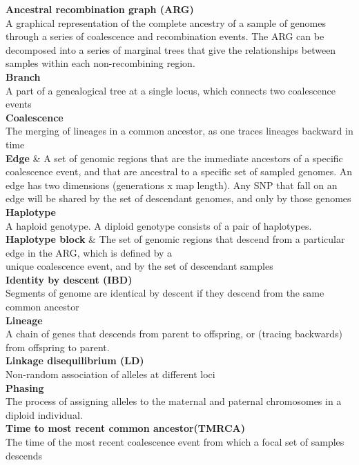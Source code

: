 \documentclass[twocolumn]{bmcart}%
\begin{document}
\begin{strip}
\begin{tcolorbox}[colback=blue!5!white,colframe=blue!50!black,title= Glossary]
\footnotesize{\textbf{Ancestral recombination graph (ARG)} \\A graphical representation of the complete ancestry of a sample of genomes through a series of coalescence and recombination events. The ARG can be decomposed into a series of marginal trees that give the relationships between samples within each non-recombining region.
   \\
\textbf{Branch}\\ A part of a genealogical tree at a single locus, which connects two coalescence events 
   \\
\textbf{Coalescence} \\The merging of lineages in a common ancestor, as one traces lineages backward in time
   \\
\textbf{Edge} \& A set of genomic regions that are the immediate ancestors of a specific coalescence event, and that are ancestral to a specific set of sampled genomes. An edge has two dimensions (generations x map length). Any SNP that fall on an edge will be shared by the set of descendant genomes, and only by those genomes
   \\
\textbf{Haplotype}\\ A haploid genotype. A diploid genotype consists of a pair of haplotypes. 
   \\
\textbf{Haplotype block} \& The set of genomic regions that descend from a particular edge in the ARG, which is defined by a \\ unique coalescence event, and by the set of descendant samples
   \\
\textbf{Identity by descent (IBD)} \\Segments of genome are identical by descent if they descend from the same common ancestor 
   \\
\textbf{Lineage} \\A chain of genes that descends from parent to offspring, or (tracing backwards) from offspring to parent. 
   \\
\textbf{Linkage disequilibrium (LD)} \\Non-random association of alleles at different loci 
   \\
\textbf{Phasing} \\The process of assigning alleles to the maternal and paternal chromosomes in a diploid individual. 
   \\
\textbf{Time to most recent common ancestor(TMRCA)} \\
  The time of the most recent coalescence event from which a focal set of samples descends}
\end{tcolorbox}
\end{strip}
\end{document}
